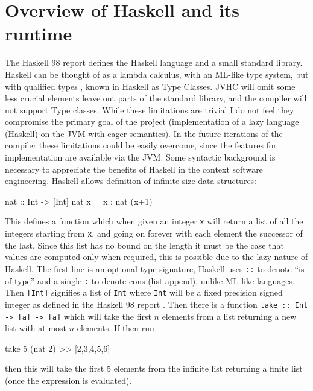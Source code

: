 \documentclass[float=false, crop=false]{standalone}
\begin{document}
\section{Overview of Haskell and its runtime}

The Haskell 98 \cite{haskell98-spec} report defines the Haskell language 
and a small standard library.
Haskell can be thought of as a lambda calculus, with an ML-like type system,
but with qualified types \cite{qualified-types}, known in 
Haskell as Type Classes. JVHC will omit some less crucial elements
leave out parts of the standard library, 
and the compiler will  not support Type classes. While these limitations are trivial I do not feel they compromise the primary goal of the project  
(implementation of a lazy language (Haskell)
on the JVM with eager semantics). In the future iterations of the compiler these limitations could be easily overcome, since the features for implementation are available via the JVM.
Some syntactic background is necessary to appreciate 
the benefits of Haskell in the context software engineering.
Haskell allows definition of infinite size data structures:
\begin{HaskellLst}
nat :: Int -> [Int]
nat x = x : nat (x+1)
\end{HaskellLst}
This defines a function which when given an integer \verb|x| will return 
a list of all the integers starting from \texttt{x}, and going on forever with
each element the successor of the last.
Since this list has no bound on the length it must be the case 
that values are computed only when required, 
this is possible due to the lazy nature of Haskell. 
The first line is an optional type signature, Haskell
uses \verb|::| to denote ``is of type'' and a single \verb|:| to denote cons (list append), unlike ML-like languages. Then \verb|[Int]| signifies a list
of \verb|Int| where \verb|Int| will be a fixed precision 
signed integer as defined in the Haskell 98 report 
\cite[]{haskell98-spec}.
Then there is a function \verb|take :: Int -> [a] -> [a]| which will
take the first $n$ elements from a list returning a new list with at most
$n$ elements.
If then run 
\begin{HaskellLst}
take 5 (nat 2)
>> [2,3,4,5,6]
\end{HaskellLst}
then this will take the first 5 elements from the infinite list returning 
a finite list (once the expression is evaluated).
\end{document}
